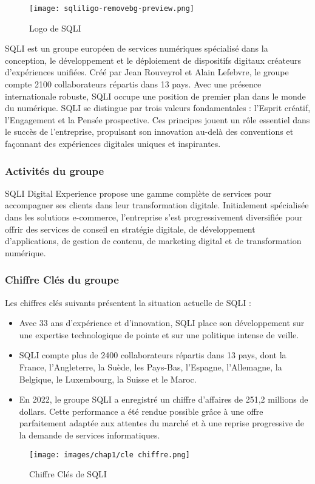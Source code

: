 \begin{figure}[H]  
  \centering  
  \texttt{[image: sqliligo-removebg-preview.png]}
  \caption{Logo de SQLI}
  \label{Logo SQLI}
\end{figure}
\indent SQLI est un groupe européen de services numériques spécialisé dans la conception, le développement et le déploiement de dispositifs digitaux créateurs d’expériences unifiées. Créé par Jean Rouveyrol et Alain Lefebvre, le groupe compte 2100 collaborateurs répartis dans 13 pays. Avec une présence internationale robuste, SQLI occupe une position de premier plan dans le monde du numérique.
SQLI se distingue par trois valeurs fondamentales : l'Esprit créatif, l'Engagement et la Pensée prospective. Ces principes jouent un rôle essentiel dans le succès de l'entreprise, propulsant son innovation au-delà des conventions et façonnant des expériences digitales uniques et inspirantes.


\subsubsection{Activités du groupe}

\indent SQLI Digital Experience propose une gamme complète de services pour accompagner ses clients dans leur transformation digitale. Initialement spécialisée dans les solutions e-commerce, l'entreprise s'est progressivement diversifiée pour offrir des services de conseil en stratégie digitale, de développement d’applications, de gestion de contenu, de marketing digital et de transformation numérique.


\subsubsection{Chiffre Clés du groupe}

\indent Les chiffres clés suivants présentent la situation actuelle de SQLI :

\begin{itemize}
    \item Avec 33 ans d’expérience et d’innovation, SQLI place son développement sur une expertise technologique de pointe et sur une politique intense de veille.
    \item SQLI compte plus de 2400 collaborateurs répartis dans 13 pays, dont la France, l'Angleterre, la Suède, les Pays-Bas, l'Espagne, l'Allemagne, la Belgique, le Luxembourg, la Suisse et le Maroc.
    \item En 2022, le groupe SQLI a enregistré un chiffre d’affaires de 251,2 millions de dollars. Cette performance a été rendue possible grâce à une offre parfaitement adaptée aux attentes du marché et à une reprise progressive de la demande de services informatiques.
    \vspace{0.5cm}
\end{itemize}
\begin{figure}[H]  
  \centering  
  \texttt{[image: images/chap1/cle chiffre.png]}
  \caption{Chiffre Clés de SQLI}
  \label{Logo SQLI}
\end{figure}

